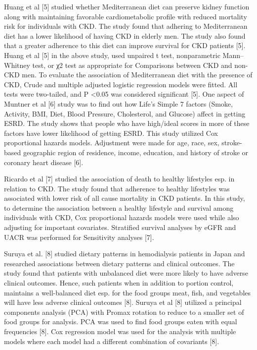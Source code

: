 Huang et al [5] studied whether Mediterranean diet can preserve kidney function along with maintaining favorable cardiometabolic profile with reduced mortality risk for individuals with CKD. The study found that adhering to Mediterranean diet has a lower likelihood of
having CKD in elderly men. The study also found that a greater adherence to this diet can improve survival for CKD patients [5]. Huang et al [5] in the above study, used unpaired t test, nonparametric Mann–Whitney test, or χ2 test as appropriate for Comparisons between CKD
and non-CKD men. To evaluate the association of Mediterranean diet with the presence of CKD, Crude and multiple adjusted logistic regression models were fitted. All tests were two-tailed, and P \textless  0.05 was considered significant [5]. One aspect of Muntner et al [6] study
was to find out how Life’s Simple 7 factors (Smoke, Activity, BMI, Diet, Blood Pressure, Cholesterol, and Glucose) affect in getting ESRD. The study shows that people who have high/ideal scores in more of these factors have lower likelihood of getting ESRD. This study
utilized Cox proportional hazards models. Adjustment were made for age, race, sex, stroke-based geographic region of residence, income, education, and history of stroke or coronary heart disease [6].

Ricardo et al [7] studied the association of death to healthy lifestyles esp. in relation to CKD. The study found that adherence to healthy lifestyles was associated with lower risk of all cause mortality in CKD patients. In this study, to determine the association between
a healthy lifestyle and survival among individuals with CKD, Cox proportional hazards models were used while also adjusting for important covariates. Stratified survival analyses by eGFR and UACR was performed for Sensitivity analyses [7].

Suruya et al. [8] studied dietary patterns in hemodialysis patients in Japan and researched associations between dietary patterns and clinical outcomes. The study found that patients with unbalanced diet were more likely to have adverse clinical outcomes. Hence, such
patients when in addition to portion control, maintains a well-balanced diet esp. for the food groups meat, fish, and vegetables will have less adverse clinical outcomes [8]. Suruya et al [8] utilized a principal components analysis (PCA) with Promax rotation to reduce to
a smaller set of food groups for analysis. PCA was used to find food groups eaten with equal frequencies [8]. Cox regression model was used for the analysis with multiple models where each model had a different combination of covariants [8].

